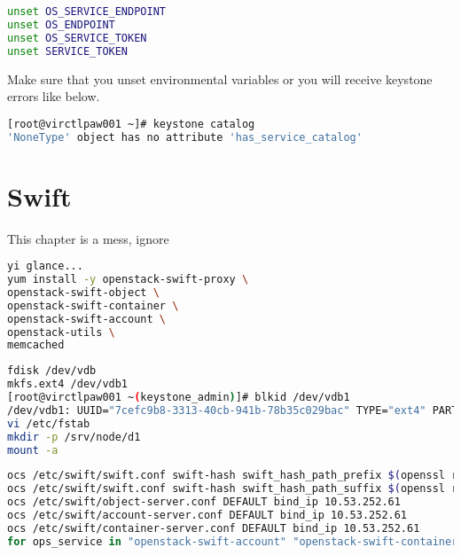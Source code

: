 \documentclass[11pt,letterpaper,oneside]{book}
\begin{document}
\begin{lstlisting}[caption={Unset Environment variables},language=bash]
unset OS_SERVICE_ENDPOINT
unset OS_ENDPOINT
unset OS_SERVICE_TOKEN
unset SERVICE_TOKEN
\end{lstlisting}

\begin{huge} \danger \end{huge} Make sure that you unset environmental variables or you will receive keystone errors like below.


\begin{lstlisting}[caption={Keystone Error Message},language=bash]
[root@virctlpaw001 ~]# keystone catalog 
'NoneType' object has no attribute 'has_service_catalog'
\end{lstlisting}

\chapter{Swift}

\begin{huge} \danger \end{huge} This chapter is a mess, ignore
\begin{lstlisting}[caption={Install Swift},language=bash]
yi glance...
yum install -y openstack-swift-proxy \
openstack-swift-object \
openstack-swift-container \
openstack-swift-account \
openstack-utils \
memcached
\end{lstlisting}

\begin{lstlisting}[caption={Install Swift},language=bash]
fdisk /dev/vdb
mkfs.ext4 /dev/vdb1 
[root@virctlpaw001 ~(keystone_admin)]# blkid /dev/vdb1 
/dev/vdb1: UUID="7cefc9b8-3313-40cb-941b-78b35c029bac" TYPE="ext4" PARTUUID="9faed234-01" 
vi /etc/fstab 
mkdir -p /srv/node/d1
mount -a
\end{lstlisting}

\begin{lstlisting}[caption={Swift account, container, object},language=bash]
ocs /etc/swift/swift.conf swift-hash swift_hash_path_prefix $(openssl rand -hex 10)
ocs /etc/swift/swift.conf swift-hash swift_hash_path_suffix $(openssl rand -hex 10)
ocs /etc/swift/object-server.conf DEFAULT bind_ip 10.53.252.61
ocs /etc/swift/account-server.conf DEFAULT bind_ip 10.53.252.61
ocs /etc/swift/container-server.conf DEFAULT bind_ip 10.53.252.61
for ops_service in "openstack-swift-account" "openstack-swift-container" "openstack-swift-object"; do systemctl enable $ops_service; systemctl start $ops_service; done
\end{lstlisting}
\end{document}
